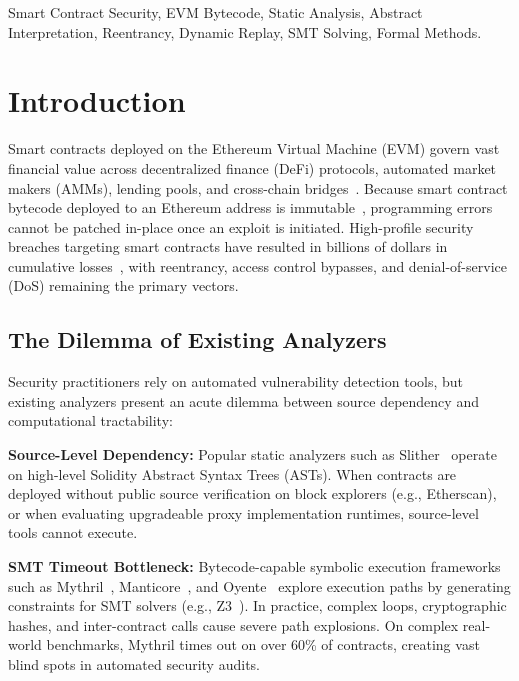 \documentclass[conference]{IEEEtran}
\begin{document}
\begin{IEEEkeywords}
Smart Contract Security, EVM Bytecode, Static Analysis, Abstract Interpretation, Reentrancy, Dynamic Replay, SMT Solving, Formal Methods.
\end{IEEEkeywords}

\section{Introduction}\label{sec:intro}

Smart contracts deployed on the Ethereum Virtual Machine (EVM) govern vast financial value across decentralized finance (DeFi) protocols, automated market makers (AMMs), lending pools, and cross-chain bridges~\cite{wood2014ethereum, atzei2017survey}. Because smart contract bytecode deployed to an Ethereum address is immutable~\cite{wood2014ethereum}, programming errors cannot be patched in-place once an exploit is initiated. High-profile security breaches targeting smart contracts have resulted in billions of dollars in cumulative losses~\cite{zhou2023sok, daian2020flash, chen2020survey}, with reentrancy, access control bypasses, and denial-of-service (DoS) remaining the primary vectors.

\subsection{The Dilemma of Existing Analyzers}
Security practitioners rely on automated vulnerability detection tools, but existing analyzers present an acute dilemma between source dependency and computational tractability:

\smallskip
\noindent\textbf{Source-Level Dependency:} Popular static analyzers such as Slither~\cite{feist2019slither} operate on high-level Solidity Abstract Syntax Trees (ASTs). When contracts are deployed without public source verification on block explorers (e.g., Etherscan), or when evaluating upgradeable proxy implementation runtimes, source-level tools cannot execute.

\smallskip
\noindent\textbf{SMT Timeout Bottleneck:} Bytecode-capable symbolic execution frameworks such as Mythril~\cite{mueller2018mythril}, Manticore~\cite{mossberg2019manticore}, and Oyente~\cite{luu2016making} explore execution paths by generating constraints for SMT solvers (e.g., Z3~\cite{de2008z3}). In practice, complex loops, cryptographic hashes, and inter-contract calls cause severe path explosions. On complex real-world benchmarks, Mythril times out on over 60\% of contracts, creating vast blind spots in automated security audits.
\end{document}
